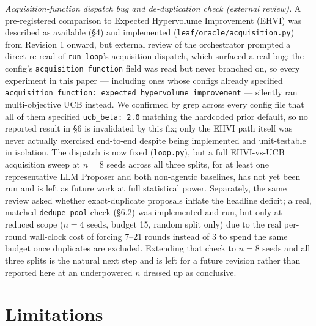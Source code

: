 \documentclass{article}
\begin{document}
\emph{Acquisition-function dispatch bug and de-duplication check (external
review).} A pre-registered comparison to Expected Hypervolume Improvement
(EHVI) was described as available (\S4) and implemented
(\texttt{leaf/oracle/acquisition.py}) from Revision 1 onward, but external
review of the orchestrator prompted a direct re-read of
\texttt{run\_loop}'s acquisition dispatch, which surfaced a real bug: the
config's \texttt{acquisition\_function} field was read but never branched
on, so every experiment in this paper --- including ones whose configs
already specified \texttt{acquisition\_function:
expected\_hypervolume\_improvement} --- silently ran multi-objective UCB
instead. We confirmed by grep across every config file that all of them
specified \texttt{ucb\_beta: 2.0} matching the hardcoded prior default, so
no reported result in \S6 is invalidated by this fix; only the EHVI path
itself was never actually exercised end-to-end despite being implemented
and unit-testable in isolation. The dispatch is now fixed
(\texttt{loop.py}), but a full EHVI-vs-UCB acquisition sweep at $n=8$
seeds across all three splits, for at least one representative LLM
Proposer and both non-agentic baselines, has not yet been run and is left
as future work at full statistical power. Separately, the same review
asked whether exact-duplicate proposals inflate the headline deficit; a
real, matched \texttt{dedupe\_pool} check (\S6.2) was implemented and run,
but only at reduced scope ($n=4$ seeds, budget 15, random split only) due
to the real per-round wall-clock cost of forcing 7--21 rounds instead of 3
to spend the same budget once duplicates are excluded. Extending that
check to $n=8$ seeds and all three splits is the natural next step and is
left for a future revision rather than reported here at an underpowered
$n$ dressed up as conclusive.

\section{Limitations}
\end{document}
